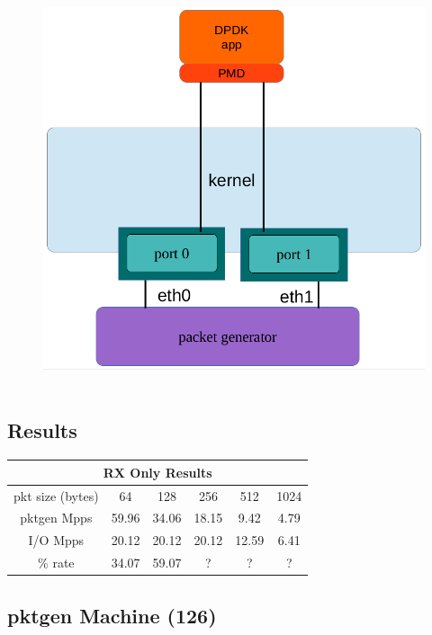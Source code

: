 \documentclass[letter]{article}
\begin{document}
{{\begin{figure}[H]
\hbox{\hspace{-0.5cm} \includegraphics[scale=0.6]{i-o-2-ports} }
\end{figure}

\subsection{Results}
\large
\begin{center}
\begin{tabular}{ |c|c|c|c|c|c| }
\hline
\multicolumn{6}{|c|}{RX Only Results} \\
 \hline
 pkt size (bytes) & 64 & 128 & 256 & 512 & 1024\\ 
\hline
 pktgen Mpps & 59.96 & 34.06 & 18.15 & 9.42 & 4.79\\ 
 I/O Mpps & 20.12 & 20.12 & 20.12 & 12.59 & 6.41\\ 
\hline
\rowcolor{yellow}
\% rate & 34.07 & 59.07 & ? & ? & ?\\
 \hline
\end{tabular}
\end{center}

\subsection{pktgen Machine (126)}

}}
\end{document}
